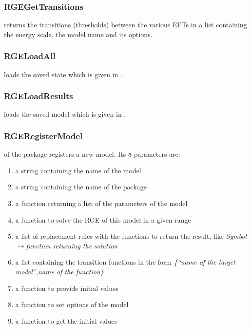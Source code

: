 \documentclass[10pt,a4paper,twoside]{scrartcl}
\begin{document}
\subsubsection{RGEGetTransitions}

 returns the transitions (thresholds)
between the various EFTs in a list
containing the energy scale, the model name and its options.
%
%


\subsubsection{RGELoadAll}

 loads the saved state which is given in
.

\subsubsection{RGELoadResults}

 loads the saved model which is given in
.

\subsubsection{RGERegisterModel}

 of the package
 registers a new model.  Its 8 parameters are:
\begin{enumerate}
  \item a string containing the name of the model
  \item a string containing the name of the package
  \item a function returning a list of the parameters of the model
  \item a function to solve the RGE of this model in a given range
  \item a list of replacement rules with the functions to return the result,
  like \textit{Symbol$\rightarrow$function returning the solution}
  \item a list containing the transition functions in the form \textit{\{``name of
  the target model'',name of the function\}}
  \item a function to provide initial values
  \item a function to set options of the model
  \item a function to get the initial values
\end{enumerate}
\end{document}
